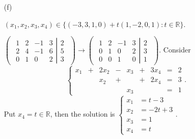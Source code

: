 \begin{Exercise}
\begin{enumerate}[(a)]
\item[(f)]
\begin{answer}
$(x_1,x_2,x_3,x_4) \in \{(-3,3,1,0)+t(1,-2,0,1):t\in\mathbb{R}\}$.
\end{answer}
\begin{solution}
$\begin{pmatrix} \left.\begin{matrix}
1 & 2 & -1 & 3 \\
2 & 4 & -1 & 6 \\
0 & 1 & 0 & 2
\end{matrix} \right| \begin{matrix}
2 \\
5 \\
3
\end{matrix} \end{pmatrix} \longrightarrow \begin{pmatrix} \left.\begin{matrix}
1 & 2 & -1 & 3 \\
0 & 1 & 0 & 2 \\
0 & 0 & 1 & 0
\end{matrix} \right| \begin{matrix}
2 \\
3 \\
1
\end{matrix} \end{pmatrix}$. Consider
$$
\left\{\begin{array}{rrrrrrrrrr}
x_1 &+&2x_2&-&x_3 &+&3x_4 &=& 2 \\
& &x_2&+& &+&2x_4 &=& 3 \\
& & & &x_3 & & &=& 1
\end{array}\right. .
$$
Put $x_4 = t\in\mathbb{R}$, then the solution is 
$
\left\{
\begin{aligned}
x_1 &= t-3 \\
x_2 &= -2t+3 \\
x_3 &= 1 \\
x_4 &= t
\end{aligned}\right.
$.

\end{solution}

\end{enumerate}
\end{Exercise}